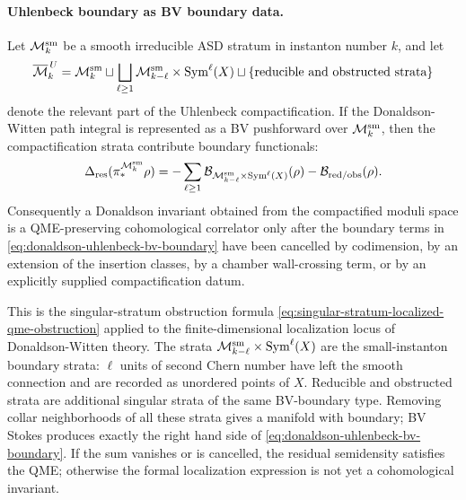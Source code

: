 \paragraph{Uhlenbeck boundary as BV boundary data.}
Let \(\mathcal M_k^{\rm sm}\) be a smooth irreducible ASD stratum in
instanton number \(k\), and let
\begin{equation}
  \overline{\mathcal M}_k^{\,U}
  =
  \mathcal M_k^{\rm sm}
  \sqcup
  \bigsqcup_{\ell\ge1}
  \mathcal M_{k-\ell}^{\rm sm}\times{\rm Sym}^{\ell}(X)
  \sqcup
  \{\text{reducible and obstructed strata}\}
  \label{eq:donaldson-uhlenbeck-strata}
\end{equation}
denote the relevant part of the Uhlenbeck compactification.  If the
Donaldson-Witten path integral is represented as a BV pushforward over
\(\mathcal M_k^{\rm sm}\), then the compactification strata contribute
boundary functionals:
\begin{equation}
  \Delta_{\rm res}(\pi_*^{\mathcal M_k^{\rm sm}}\rho)
  =
  -\sum_{\ell\ge1}
  \mathcal B_{\mathcal M_{k-\ell}^{\rm sm}\times{\rm Sym}^{\ell}(X)}(\rho)
  -\mathcal B_{\rm red/obs}(\rho).
  \label{eq:donaldson-uhlenbeck-bv-boundary}
\end{equation}
Consequently a Donaldson invariant obtained from the compactified moduli
space is a QME-preserving cohomological correlator only after the boundary
terms in \eqref{eq:donaldson-uhlenbeck-bv-boundary} have been cancelled by
codimension, by an extension of the insertion classes, by a chamber
wall-crossing term, or by an explicitly supplied compactification datum.

This is the singular-stratum obstruction formula
\eqref{eq:singular-stratum-localized-qme-obstruction} applied to the
finite-dimensional localization locus of Donaldson-Witten theory.  The strata
\(\mathcal M_{k-\ell}^{\rm sm}\times{\rm Sym}^{\ell}(X)\) are the
small-instanton boundary strata: \(\ell\) units of second Chern number have
left the smooth connection and are recorded as unordered points of \(X\).
Reducible and obstructed strata are additional singular strata of the same
BV-boundary type.  Removing collar neighborhoods of all these strata gives a
manifold with boundary; BV Stokes produces exactly the right hand side of
\eqref{eq:donaldson-uhlenbeck-bv-boundary}.  If the sum vanishes or is
cancelled, the residual semidensity satisfies the QME; otherwise the
formal localization expression is not yet a cohomological invariant.

